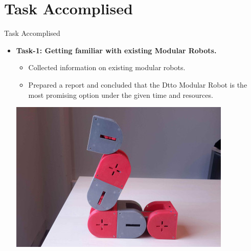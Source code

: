 \documentclass[10pt, a4paper]{beamer}
\begin{document}
\section{Task Accomplised}
\begin{frame}{Task Accomplised}
	\begin{itemize}
		\item \textbf{Task-1: Getting familiar with existing Modular Robots.}
		  \begin{itemize}
		  \item Collected information on existing modular robots.
		  \item Prepared a report and concluded that the Dtto Modular Robot is the most promising option under the given time and resources.
           \end{itemize}
           \vspace{15pt}
        \centering\includegraphics[scale=0.4]{dtto.jpg}   
		
	\end{itemize}
\end{frame}
\end{document}
